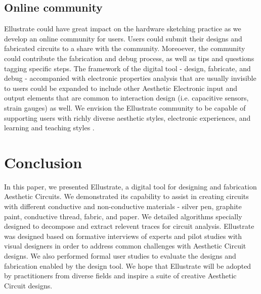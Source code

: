 \documentclass{sigchi}
\begin{document}
\subsection{Online community}
Ellustrate could have great impact on the hardware sketching practice as we develop an online community for users. Users could submit their designs and fabricated circuits to a share with the community. Moreoever, the community could contribute the fabrication and debug process, as well as tips and questions tagging specific steps. The framework of the digital tool - design, fabricate, and debug - accompanied with electronic properties analysis that are usually invisible to users could be expanded to include other Aesthetic Electronic input and output elements that are common to interaction design (i.e. capacitive sensors, strain gauges) as well. We envision the Ellustrate community to be capable of supporting users with richly diverse aesthetic styles, electronic experiences, and learning and teaching styles .

\section {Conclusion}
In this paper, we presented Ellustrate, a digital tool for designing and fabrication Aesthetic Circuits. We demonstrated its capability to assist in creating circuits with different conductive and non-conductive materials - silver pen, graphite paint, conductive thread, fabric, and paper. We detailed algorithms specially designed to decompose and extract relevent traces for circuit analysis. Ellustrate was designed based on formative interviews of experts and pilot studies with visual designers in order to address common challenges with Aesthetic Circuit designs. We also performed formal user studies to evaluate the designs and fabrication enabled by the design tool. We hope that Ellustrate will be adopted by practitioners from diverse fields and inspire a suite of creative Aesthetic Circuit designs.

\balance



\end{document}
